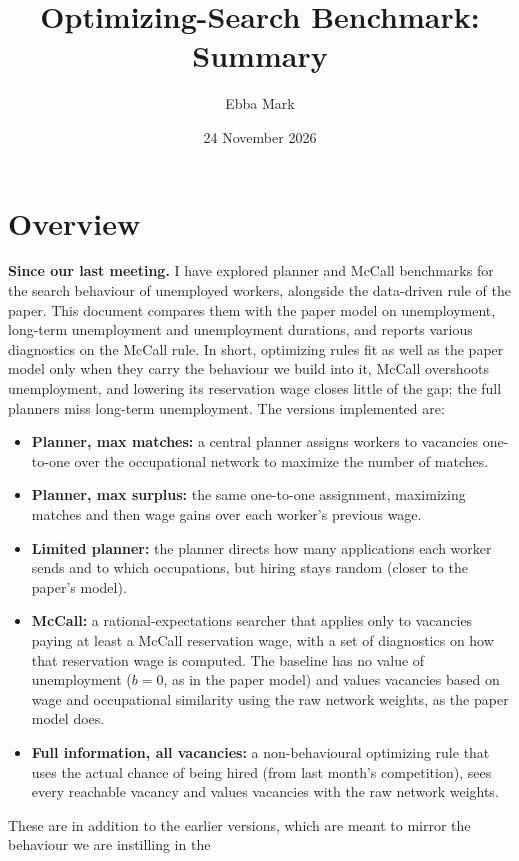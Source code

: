 \documentclass[10pt]{article}
\title{\vspace{-1.5cm}Optimizing-Search Benchmark: Summary}
\author{Ebba Mark}
\date{24 November 2026}
\begin{document}
\maketitle
\vspace{-0.8cm}

\section{Overview}
\textbf{Since our last meeting.} I have explored planner and McCall benchmarks for the search behaviour of
unemployed workers, alongside the data-driven rule of the paper. This document compares them with the paper model
on unemployment, long-term unemployment and unemployment durations, and reports various diagnostics on the McCall rule. In
short, optimizing rules fit as well as the paper model only when they carry the behaviour we build into it, McCall overshoots unemployment, and lowering its reservation wage closes little of the gap; the full planners miss long-term unemployment. The versions implemented are:
\begin{itemize}[leftmargin=*]
  \item \textbf{Planner, max matches:} a central planner assigns workers to vacancies one-to-one over the
  occupational network to maximize the number of matches.
  \item \textbf{Planner, max surplus:} the same one-to-one assignment, maximizing matches and then wage gains
  over each worker's previous wage.
  \item \textbf{Limited planner:} the planner directs how many applications each worker sends and to which
  occupations, but hiring stays random (closer to the paper's model).
  \item \textbf{McCall:} a rational-expectations searcher that applies only to vacancies paying at least a
  McCall reservation wage, with a set of diagnostics on how that reservation wage is computed. The baseline has
  no value of unemployment ($b = 0$, as in the paper model) and values vacancies based on wage and occupational similarity using the raw network weights,
  as the paper model does.
  \item \textbf{Full information, all vacancies:} a non-behavioural optimizing rule that uses the actual chance
  of being hired (from last month's competition), sees every reachable vacancy and values vacancies with the
  raw network weights.
\end{itemize}
These are in addition to the earlier versions, which are meant to mirror the behaviour we are instilling in the
\end{document}
